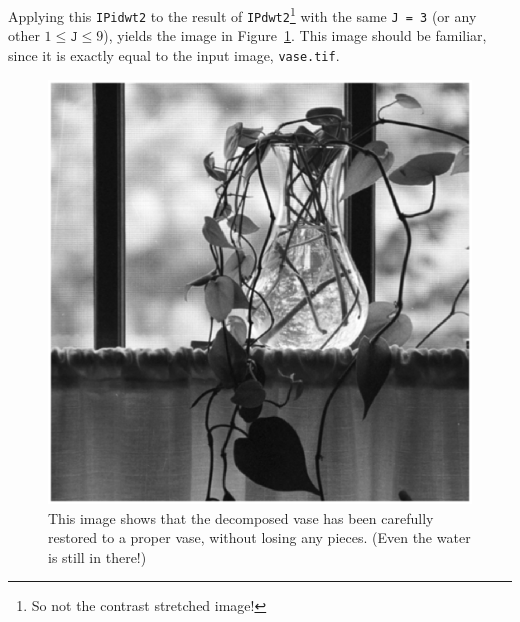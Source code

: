 Applying this \texttt{IPidwt2} to the result of \texttt{IPdwt2}\footnote{So not the contrast stretched image!} with the same \texttt{J = 3} (or any other \(1 \leq \texttt{J} \leq 9\)), yields the image in Figure~\ref{fig:vase_restored}. This image should be familiar, since it is exactly equal to the input image, \texttt{vase.tif}.

\begin{figure}[htb]
 \centering
 \includegraphics[width=\linewidth]{vase_restored.eps}
 \caption{This image shows that the decomposed vase has been carefully restored to a proper vase, without losing any pieces. (Even the water is still in there!)}
 \label{fig:vase_restored}
\end{figure}

\clearpage